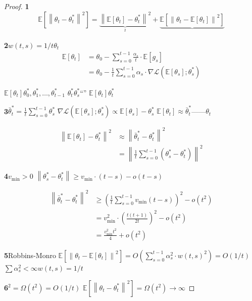 \documentclass[11pt,a4paper]{article}
\theoremstyle{remark}
\newcommand{\E}{\mathbb{E}}
\newcommand{\norm}[1]{\left\lVert#1\right\rVert}
\begin{document}
\begin{proof}
\textbf{1}
\begin{equation}\label{eq:decomp}
    \E[\norm{\theta_t - \theta_t^*}^2]
    = \underbrace{\norm{\E[\theta_t] - \theta_t^*}^2}_{\text{}^2}
    + \underbrace{\E[\norm{\theta_t - \E[\theta_t]}^2]}_{\text{}}
\end{equation}

\textbf{2}$w(t,s) = 1/t$$\theta_t$
\begin{align}
    \E[\theta_t] &= \theta_0 - \sum_{s=0}^{t-1} \frac{\alpha_s}{t} \cdot \E[g_s] \nonumber\\
    &= \theta_0 - \frac{1}{t}\sum_{s=0}^{t-1} \alpha_s \cdot \nabla\mathcal{L}(\E[\theta_s]; \theta_s^*)
\end{align}

$\E[\theta_t]$\textbf{}$\theta_0^*, \theta_1^*, \ldots, \theta_{t-1}^*$
$\theta_t^*$$\theta_s^*$``''
$\E[\theta_t]$$\theta_t^*$

\textbf{3}$\bar{\theta}_t^* = \frac{1}{t}\sum_{s=0}^{t-1} \theta_s^*$
$\nabla\mathcal{L}(\E[\theta_s]; \theta_s^*) \propto \E[\theta_s] - \theta_s^*$
$\E[\theta_t] \approx \bar{\theta}_t^*$——$\theta_t$


\begin{align}
    \norm{\E[\theta_t] - \theta_t^*}^2
    &\approx \norm{\bar{\theta}_t^* - \theta_t^*}^2 \nonumber\\
    &= \norm{\frac{1}{t}\sum_{s=0}^{t-1}(\theta_s^* - \theta_t^*)}^2
\end{align}

\textbf{4}$v_{\min} > 0$
$\norm{\theta_s^* - \theta_t^*} \geq v_{\min} \cdot (t - s) - o(t-s)$

\begin{align}
    \norm{\bar{\theta}_t^* - \theta_t^*}^2
    &\geq \left(\frac{1}{t}\sum_{s=0}^{t-1} v_{\min}(t-s)\right)^2 - o(t^2) \nonumber\\
    &= v_{\min}^2 \cdot \left(\frac{t(t+1)}{2t}\right)^2 - o(t^2) \nonumber\\
    &= \frac{v_{\min}^2 t^2}{4} + o(t^2)
\end{align}

\textbf{5}Robbins-Monro
$\E[\norm{\theta_t - \E[\theta_t]}^2] = O(\sum_{s=0}^{t-1} \alpha_s^2 \cdot w(t,s)^2) = O(1/t)$
$\sum \alpha_s^2 < \infty$$w(t,s) = 1/t$

\textbf{6}$^2 = \Omega(t^2)$$= O(1/t)$
$\E[\norm{\theta_t - \theta_t^*}^2] = \Omega(t^2) \to \infty$
\end{proof}
\end{document}
